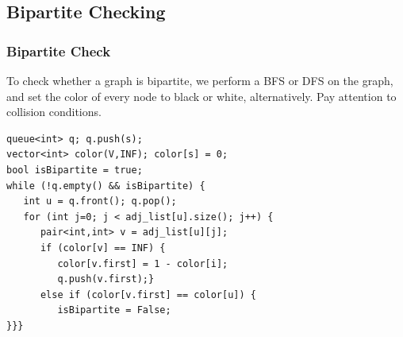 \subsection{Bipartite Checking}

\begin{frame}[fragile]
  \frametitle{Bipartite Check}
  {\smaller
  To check whether a graph is bipartite, we perform a BFS or DFS on the graph,
  and set the color of every node to black or white, alternatively. Pay
  attention to collision conditions.

  \begin{exampleblock}{}
\begin{verbatim}
queue<int> q; q.push(s);
vector<int> color(V,INF); color[s] = 0;
bool isBipartite = true;
while (!q.empty() && isBipartite) {
   int u = q.front(); q.pop();
   for (int j=0; j < adj_list[u].size(); j++) {
      pair<int,int> v = adj_list[u][j];
      if (color[v] == INF) {
         color[v.first] = 1 - color[i];
         q.push(v.first);}
      else if (color[v.first] == color[u]) {
         isBipartite = False;
}}}
\end{verbatim}
  \end{exampleblock}
  }
\end{frame}

